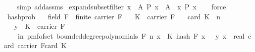 \begin{isabellebody}
\ \ \isamarkupfalse%
\ {\isacharparenleft}{\kern0pt}simp\ add{\isacharcolon}{\kern0pt}assms{\isacharparenright}{\kern0pt}%
\endisatagproof
{\isafoldproof}%
%
\isadelimproof
\isanewline
%
\endisadelimproof
\isanewline
{}\isamarkupfalse%
\ expand{\isacharunderscore}{\kern0pt}subset{\isacharunderscore}{\kern0pt}filter{\isacharcolon}{\kern0pt}\ {\isachardoublequoteopen}{\isacharbraceleft}{\kern0pt}x\ {\isasymin}\ A{\isachardot}{\kern0pt}\ P\ x{\isacharbraceright}{\kern0pt}\ {\isacharequal}{\kern0pt}\ A\ {\isasyminter}\ {\isacharbraceleft}{\kern0pt}x{\isachardot}{\kern0pt}\ P\ x{\isacharbraceright}{\kern0pt}{\isachardoublequoteclose}\isanewline
%
\isadelimproof
\ \ %
\endisadelimproof
%
\isatagproof
{}\isamarkupfalse%
\ force%
\endisatagproof
{\isafoldproof}%
%
\isadelimproof
\isanewline
%
\endisadelimproof
\isanewline
{}\isamarkupfalse%
\ hash{\isacharunderscore}{\kern0pt}prob{\isacharcolon}{\kern0pt}\isanewline
\ \ \ {\isachardoublequoteopen}field\ F\ {\isasymand}\ finite\ {\isacharparenleft}{\kern0pt}carrier\ F{\isacharparenright}{\kern0pt}{\isachardoublequoteclose}\isanewline
\ \ \ {\isachardoublequoteopen}K\ {\isasymsubseteq}\ carrier\ F{\isachardoublequoteclose}\isanewline
\ \ \ {\isachardoublequoteopen}card\ K\ {\isasymle}\ n{\isachardoublequoteclose}\isanewline
\ \ \ {\isachardoublequoteopen}y\ {\isacharbackquote}{\kern0pt}\ K\ {\isasymsubseteq}\ carrier\ F{\isachardoublequoteclose}\isanewline
\ \ \ {\isachardoublequoteopen}{\isasymP}{\isacharparenleft}{\kern0pt}{\isasymomega}\ in\ pmf{\isacharunderscore}{\kern0pt}of{\isacharunderscore}{\kern0pt}set\ {\isacharparenleft}{\kern0pt}bounded{\isacharunderscore}{\kern0pt}degree{\isacharunderscore}{\kern0pt}polynomials\ F\ n{\isacharparenright}{\kern0pt}{\isachardot}{\kern0pt}\ {\isacharparenleft}{\kern0pt}{\isasymforall}x\ {\isasymin}\ K{\isachardot}{\kern0pt}\ hash\ F\ x\ {\isasymomega}\ {\isacharequal}{\kern0pt}\ y\ x{\isacharparenright}{\kern0pt}{\isacharparenright}{\kern0pt}\ {\isacharequal}{\kern0pt}\ {}{\isacharslash}{\kern0pt}{\isacharparenleft}{\kern0pt}real\ {\isacharparenleft}{\kern0pt}card\ {\isacharparenleft}{\kern0pt}carrier\ F{\isacharparenright}{\kern0pt}{\isacharparenright}{\kern0pt}{\isacharparenright}{\kern0pt}{\isacharcircum}{\kern0pt}card\ K{\isachardoublequoteclose}\ \isanewline
%
\isadelimproof
%
\endisadelimproof
%
\isatagproof
{}\isamarkupfalse%
\ {\isacharminus}{\kern0pt}\isanewline
\ \ \isamarkupfalse%

\end{isabellebody}
